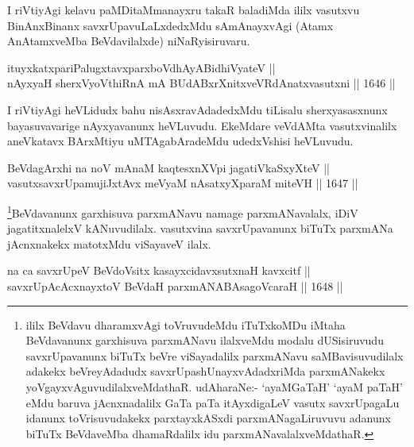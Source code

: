 \begin{artha}
I riVtiyAgi kelavu paMDitaMmanayxru takaR baladiMda ililx vasutxvu BinAnxBinanx savxrUpavuLaLxdedxMdu sAmAnayxvAgi (Atamx AnAtamxveMba BeVdavilalxde) niNaRyisiruvaru.
\end{artha}


\begin{shl}
ituyxkatxpariPalugxtavxparxboVdhAyABidhiVyateV || \\
nAyxyaH sherxVyoVthiRnA mA BUdABxrXnitxveVRdAnatxvasutxni \hfill || 1646 ||  
\end{shl}

\begin{artha}
I riVtiyAgi heVLidudx bahu nisAsxravAdadedxMdu tiLisalu sherxyasasxnunx bayasuvavarige nAyxyavanunx heVLuvudu. EkeMdare veVdAMta vasutxvinalilx aneVkatavx BArxMtiyu uMTAgabAradeMdu udedxVshisi heVLuvudu.
\end{artha}

\begin{shl}
BeVdagArxhi na noV mAnaM kaqtesxnXV\s pi jagatiVkaSxyXteV ||  \\
vasutxsavxrUpamujiJxtAvx meVyaM nAsatxyXparaM miteVH \hfill || 1647 ||  
\end{shl}

\begin{artha}
\footnote{ililx BeVdavu dharamxvAgi toVruvudeMdu iTuTxkoMDu iMtaha BeVdavanunx garxhisuva parxmANavu ilalxveMdu modalu dUSisiruvudu savxrUpavanunx biTuTx beVre viSayadalilx parxmANavu saMBavisuvudilalx adakekx beVreyAdadudx savxrUpashUnayxvAdadxriMda parxmANakekx yoVgayxvAguvudilalxveMdathaR. udAharaNe:- `ayaMGaTaH' `ayaM paTaH' eMdu baruva jAcnxnadalilx GaTa paTa itAyxdigaLeV vasutx savxrUpagaLu idanunx toVrisuvudakekx parxtayxkASxdi parxmANagaLiruvuvu adanunx biTuTx BeVdaveMba dhamaRdalilx idu parxmANavalalxveMdathaR.}BeVdavanunx garxhisuva parxmANavu namage parxmANavalalx, iDiV jagatitxnalelxV kANuvudilalx. vasutxvina savxrUpavanunx biTuTx parxmANa jAcnxnakekx matotxMdu viSayaveV ilalx.
\end{artha}


\begin{shl}
na ca savxrUpeV BeVdoV\s sitx kasayxcidavxsutxnaH kavxcitf || \\
savxrUpAcAcxnayxtoV BeVdaH parxmANABAsagoVcaraH \hfill || 1648 ||  
\end{shl}

